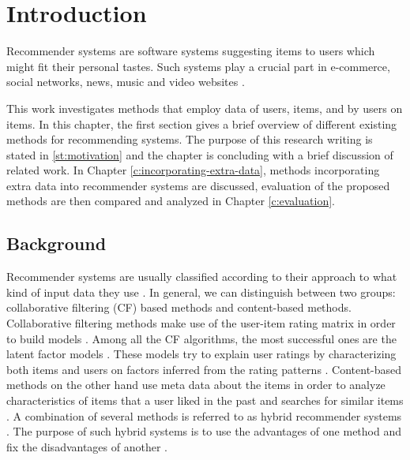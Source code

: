 \chapter{Introduction}
\label{c:introduction}

Recommender systems are software systems suggesting items to users which might fit their personal tastes.
Such systems play a crucial part in e-commerce, social networks, news, music and video websites \cite{Christoffel2014,Almahairi2015}.

This work investigates methods that employ data of users, items, and by users on items.
In this chapter, the first section gives a brief overview of different existing methods for recommending systems.
The purpose of this research writing is stated in \ref{st:motivation} and the chapter is concluding with a brief discussion of related work.
In Chapter \ref{c:incorporating-extra-data}, methods incorporating extra data into recommender systems are discussed, evaluation of the proposed methods are then compared and analyzed in Chapter \ref{c:evaluation}.



\section{Background}
\label{st:background}

Recommender systems are usually classified according to their approach to what kind of input data they use \cite{Christoffel2014}.
In general, we can distinguish between two groups: collaborative filtering (CF) based methods and content-based methods.
Collaborative filtering methods make use of the user-item rating matrix in order to build models \cite{Kabbur2014}.
Among all the CF algorithms, the most successful ones are the latent factor models \cite{Bao2014}.
These models try to explain user ratings by characterizing both items and users on factors inferred from the rating patterns \cite{Bao2014}.
Content-based methods on the other hand use meta data about the items in order to analyze characteristics of items that a user liked in the past and searches for similar items \cite{Christoffel2014}.
A combination of several methods is referred to as hybrid recommender systems \cite{Ricci2011}.
The purpose of such hybrid systems is to use the advantages of one method and fix the disadvantages of another \cite{Ricci2011}.

